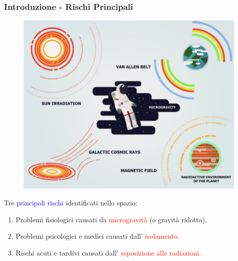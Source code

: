 \documentclass[9pt]{beamer}
\begin{document}
\begin{frame} [fragile]
	\frametitle{Introduzione - Rischi Principali}
	\begin{minipage}{1\textwidth}
	  \begin{figure}
	  \centering
			\includegraphics[scale=0.2]{figures/fig3.jpeg}
		\end{figure}
	\end{minipage}
	\newline
	
Tre  \textcolor{blue}{principali rischi} identificati nello spazio:
\begin{block}

\begin{enumerate}
\item Problemi fisiologici causati da \textcolor{red}{microgravit\`a} (o gravit\`a ridotta).
\item Problemi psicologici e medici causati dall' \textcolor{red}{isolamento}.
\item Rischi acuti e tardivi causati dall' \textcolor{red}{esposizione alle radiazioni}.
\end{enumerate}
\end{block}
\end{frame}
	
\end{document}

